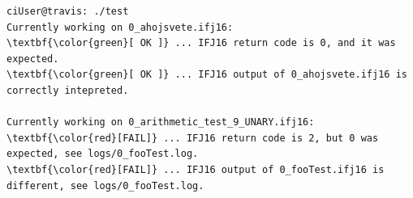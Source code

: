 \documentclass[a4paper,11pt]{article}
\begin{document}

\begin{Verbatim}
ciUser@travis: ./test
Currently working on 0_ahojsvete.ifj16:
\textbf{\color{green}[ OK ]} ... IFJ16 return code is 0, and it was expected.
\textbf{\color{green}[ OK ]} ... IFJ16 output of 0_ahojsvete.ifj16 is correctly intepreted.

Currently working on 0_arithmetic_test_9_UNARY.ifj16:
\textbf{\color{red}[FAIL]} ... IFJ16 return code is 2, but 0 was expected, see logs/0_fooTest.log.
\textbf{\color{red}[FAIL]} ... IFJ16 output of 0_fooTest.ifj16 is different, see logs/0_fooTest.log.
\end{Verbatim}
\end{document}
